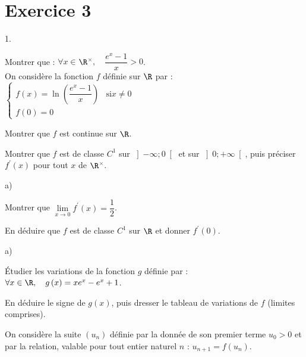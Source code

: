 \documentclass[11pt]{article}%
\begin{document}
\section*{Exercice 3}

\begin{noliste}{1.}
 \setlength{\itemsep}{4mm}
\item Montrer que : $\forall x\in ${$\R$}$^{\times },\quad \dfrac{
e^{x}-1}{x}>0$.\\
On considère la fonction $f$ définie sur $\R$ par : $
\left\{
\begin{array}{cl}
f\left( x\right) = \ln \left( \dfrac{e^{x}-1}{x}\right) & \text{si
}x\neq 0
\\
f\left( {0}\right) = 0 & 
\end{array}
\right.
$

\item Montrer que $f$ est continue sur $\R$.

\item Montrer que $f$ est de classe $C^{1}$ sur $\left] {-\infty
;0}\right[ $
et sur $\left] {0; + \infty }\right[ $, puis préciser $f^{\prime
}\left(
x\right) $ pour tout $x$ de {$\R$}$^{\times }$.

\item 

\begin{noliste}{a)}
 \setlength{\itemsep}{2mm}
\item Montrer que $\underset{x\rightarrow 0}{\lim }f^{\prime }\left(
x\right) = \dfrac{1}{2}$.

\item En déduire que $f$ est de classe $C^{1}$ sur $\R$ et donner
$f^{\prime }\left( {0}\right) $.
\end{noliste}

\item 

\begin{noliste}{a)}
 \setlength{\itemsep}{2mm}
\item Étudier les variations de la fonction $g$ définie par : $\forall
x\in 
\R,\quad g\left( x\right) = xe^{x}-e^{x} + 1$.

\item En déduire le signe de $g\left( x\right) $, puis dresser le
tableau de
variations de $f$ (limites comprises).
\end{noliste}

\vspace{0pt} On considère la suite $\left( u_{n}\right) $ définie par
la donnée de son premier terme $u_{0}>0$ et par la relation, valable
pour tout entier naturel $n$ : $u_{n + 1} = f\left( u_{n}\right) $.


\end{noliste}
\end{document}

